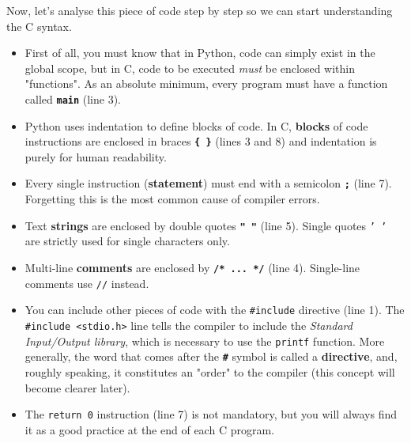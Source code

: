 Now, let's analyse this piece of code step by step so we can start understanding the C syntax. 
\begin{itemize}
    \item[-] First of all, you must know that in Python, code can simply exist in the global scope, but in C, code to be executed \textit{must} be enclosed within "functions". As an absolute minimum, every program must have a function called \textbf{\texttt{main}} (line 3).
    \item[-] Python uses indentation to define blocks of code. In C, \textbf{blocks} of code instructions are enclosed in braces \textbf{\texttt{\{ \}}} (lines 3 and 8) and indentation is purely for human readability.
    \item[-] Every single instruction (\textbf{statement}) must end with a semicolon \textbf{\texttt{;}} (line 7). Forgetting this is the most common cause of compiler errors.
    \item[-] Text \textbf{strings} are enclosed by double quotes \textbf{\texttt{" "}} (line 5). Single quotes \texttt{' '} are strictly used for single characters only.
    \item[-] Multi-line \textbf{comments} are enclosed by \textbf{\texttt{/* ... */}} (line 4). Single-line comments use \texttt{//} instead.
    \item[-] You can include other pieces of code with the \texttt{\#include} directive (line 1). The \texttt{\#include <stdio.h>} line tells the compiler to include the \textit{Standard Input/Output library}, which is necessary to use the \texttt{printf} function. More generally, the word that comes after the \textbf{\texttt{\#}} symbol is called a \textbf{directive}, and, roughly speaking, it constitutes an "order" to the compiler (this concept will become clearer later).
    \item[-] The \texttt{return 0} instruction (line 7) is not mandatory, but you will always find it as a good practice at the end of each C program.
\end{itemize}

